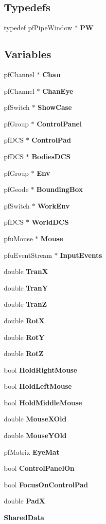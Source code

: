 \subsection*{Typedefs}
\begin{CompactItemize}
\item 
typedef pf\-Pipe\-Window $\ast$ {\bf PW}
\end{CompactItemize}
\subsection*{Variables}
\begin{CompactItemize}
\item 
pf\-Channel $\ast$ {\bf Chan}
\item 
pf\-Channel $\ast$ {\bf Chan\-Eye}
\item 
pf\-Switch $\ast$ {\bf Show\-Case}
\item 
pf\-Group $\ast$ {\bf Control\-Panel}
\item 
pf\-DCS $\ast$ {\bf Control\-Pad}
\item 
pf\-DCS $\ast$ {\bf Bodies\-DCS}
\item 
pf\-Group $\ast$ {\bf Env}
\item 
pf\-Geode $\ast$ {\bf Bounding\-Box}
\item 
pf\-Switch $\ast$ {\bf Work\-Env}
\item 
pf\-DCS $\ast$ {\bf World\-DCS}
\item 
pfu\-Mouse $\ast$ {\bf Mouse}
\item 
pfu\-Event\-Stream $\ast$ {\bf Input\-Events}
\item 
double {\bf Tran\-X}
\item 
double {\bf Tran\-Y}
\item 
double {\bf Tran\-Z}
\item 
double {\bf Rot\-X}
\item 
double {\bf Rot\-Y}
\item 
double {\bf Rot\-Z}
\item 
bool {\bf Hold\-Right\-Mouse}
\item 
bool {\bf Hold\-Left\-Mouse}
\item 
bool {\bf Hold\-Middle\-Mouse}
\item 
double {\bf Mouse\-XOld}
\item 
double {\bf Mouse\-YOld}
\item 
pf\-Matrix {\bf Eye\-Mat}
\item 
bool {\bf Control\-Panel\-On}
\item 
bool {\bf Focus\-On\-Control\-Pad}
\item 
double {\bf Pad\-X}
\item 
{\bf Shared\-Data}
\end{CompactItemize}


